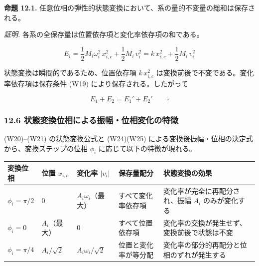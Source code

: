 \documentclass[a4paper,11pt]{ltjsarticle}
\newcounter{none}
\begin{document}
\textbf{命題 12.1.}
任意位相の弾性的状態変換において、系の量的不変量の総和は保存される。

\emph{証明.} 各系の全保存量は位置依存項と変化率依存項の和である。

\[E_i = \frac{1}{2}M_i\omega_i^2\,x_{i,c}^2 + \frac{1}{2}M_i\,v_i^2 = k\,x_{i,c}^2 + \frac{1}{2}M_i\,v_i^2\]

状態変換は瞬間的であるため、位置依存項 \(k\,x_{i,c}^2\)
は変換前後で不変である。変化率依存項は保存条件 (W19)
により保存される。したがって

\[E_1 + E_2 = E_1' + E_2' \qquad \square \tag{W26}\]

\subsubsection{12.6
状態変換位相による振幅・位相変化の特徴}\label{ux72b6ux614bux5909ux63dbux4f4dux76f8ux306bux3088ux308bux632fux5e45ux4f4dux76f8ux5909ux5316ux306eux7279ux5fb4}

(W20)--(W21) の状態変換公式と (W24)(W25)
による変換後振幅・位相の決定式から、変換ステップの位相 \(\phi_i\)
に応じて以下の特徴が現れる。

{\def\LTcaptype{none} %
\begin{longtable}[]{@{}
  >{\raggedright\arraybackslash}p{}
  >{\raggedright\arraybackslash}p{}
  >{\raggedright\arraybackslash}p{}
  >{\raggedright\arraybackslash}p{}
  >{\raggedright\arraybackslash}p{}@{}}
\toprule\noalign{}
\begin{minipage}[b]{\linewidth}\raggedright
変換位相
\end{minipage} & \begin{minipage}[b]{\linewidth}\raggedright
位置 \(x_{i,c}\)
\end{minipage} & \begin{minipage}[b]{\linewidth}\raggedright
変化率 \(|v_i|\)
\end{minipage} & \begin{minipage}[b]{\linewidth}\raggedright
保存量配分
\end{minipage} & \begin{minipage}[b]{\linewidth}\raggedright
状態変換の効果
\end{minipage} \\
\midrule\noalign{}
\endhead
\bottomrule\noalign{}
\endlastfoot
\(\phi_i = \pi/2\) & \(0\) & \(A_i\omega_i\)（最大） &
すべて変化率依存項 & 変化率が完全に再配分され、振幅 \(A_i\)
のみが変化する \\
\(\phi_i = 0\) & \(A_i\)（最大） & \(0\) & すべて位置依存項 &
変化率の交換が発生せず、変換前後で状態は不変 \\
\(\phi_i = \pi/4\) & \(A_i/\sqrt{2}\) & \(A_i\omega_i/\sqrt{2}\) &
位置と変化率が等分配 & 変化率の部分的再配分と位相のずれが発生する \\
\end{longtable}
}
\end{document}
